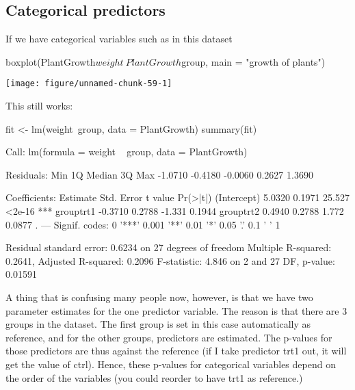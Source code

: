 \documentclass[a4paper,twoside]{tufte-book}\usepackage[]{graphicx}\usepackage[]{color}
\makeatletter
\def\maxwidth{ %
  \ifdim\Gin@nat@width>\linewidth
    \linewidth
  \else
    \Gin@nat@width
  \fi
}
\makeatother
\begin{document}
\begin{appendices}
\subsection{Categorical predictors}

If we have categorical variables such as in this dataset

\begin{Schunk}
\begin{Sinput}
boxplot(PlantGrowth$weight~PlantGrowth$group, main = "growth of plants")
\end{Sinput}

\texttt{[image: figure/unnamed-chunk-59-1]} \end{Schunk}

This still works:

\begin{Schunk}
\begin{Sinput}
fit <- lm(weight~group, data = PlantGrowth)
summary(fit)
\end{Sinput}
\begin{Soutput}

Call:
lm(formula = weight ~ group, data = PlantGrowth)

Residuals:
    Min      1Q  Median      3Q     Max 
-1.0710 -0.4180 -0.0060  0.2627  1.3690 

Coefficients:
            Estimate Std. Error t value Pr(>|t|)    
(Intercept)   5.0320     0.1971  25.527   <2e-16 ***
grouptrt1    -0.3710     0.2788  -1.331   0.1944    
grouptrt2     0.4940     0.2788   1.772   0.0877 .  
---
Signif. codes:  0 '***' 0.001 '**' 0.01 '*' 0.05 '.' 0.1 ' ' 1

Residual standard error: 0.6234 on 27 degrees of freedom
Multiple R-squared:  0.2641,	Adjusted R-squared:  0.2096 
F-statistic: 4.846 on 2 and 27 DF,  p-value: 0.01591
\end{Soutput}
\end{Schunk}

A thing that is confusing many people now, however, is that we have two parameter estimates for the one predictor variable. The reason is that there are 3 groups in the dataset. The first group is set in this case automatically as reference, and for the other groups, predictors are estimated. The p-values for those predictors are thus against the reference (if I take predictor trt1 out, it will get the value of ctrl). Hence, these p-values for categorical variables depend on the order of the variables (you could reorder to have trt1 as reference.)



\end{appendices}
\end{document}
